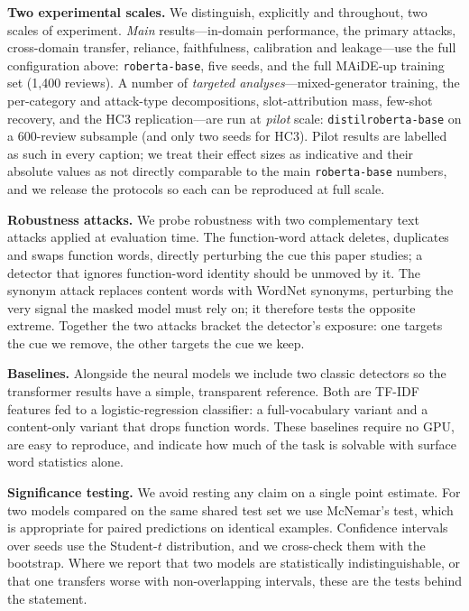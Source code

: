 \documentclass[10pt,twocolumn]{article}
\begin{document}
\textbf{Two experimental scales.} We distinguish, explicitly and throughout, two scales of experiment. \emph{Main} results---in-domain performance, the primary attacks, cross-domain transfer, reliance, faithfulness, calibration and leakage---use the full configuration above: \texttt{roberta-base}, five seeds, and the full MAiDE-up training set (1,400 reviews). A number of \emph{targeted analyses}---mixed-generator training, the per-category and attack-type decompositions, slot-attribution mass, few-shot recovery, and the HC3 replication---are run at \emph{pilot} scale: \texttt{distilroberta-base} on a 600-review subsample (and only two seeds for HC3). Pilot results are labelled as such in every caption; we treat their effect sizes as indicative and their absolute values as not directly comparable to the main \texttt{roberta-base} numbers, and we release the protocols so each can be reproduced at full scale.

\textbf{Robustness attacks.} We probe robustness with two complementary text attacks applied at evaluation time. The function-word attack deletes, duplicates and swaps function words, directly perturbing the cue this paper studies; a detector that ignores function-word identity should be unmoved by it. The synonym attack replaces content words with WordNet \cite{wordnet} synonyms, perturbing the very signal the masked model must rely on; it therefore tests the opposite extreme. Together the two attacks bracket the detector's exposure: one targets the cue we remove, the other targets the cue we keep.

\textbf{Baselines.} Alongside the neural models we include two classic detectors so the transformer results have a simple, transparent reference. Both are TF-IDF features fed to a logistic-regression classifier: a full-vocabulary variant and a content-only variant that drops function words. These baselines require no GPU, are easy to reproduce, and indicate how much of the task is solvable with surface word statistics alone.

\textbf{Significance testing.} We avoid resting any claim on a single point estimate. For two models compared on the same shared test set we use McNemar's test, which is appropriate for paired predictions on identical examples. Confidence intervals over seeds use the Student-$t$ distribution, and we cross-check them with the bootstrap. Where we report that two models are statistically indistinguishable, or that one transfers worse with non-overlapping intervals, these are the tests behind the statement.
\end{document}
